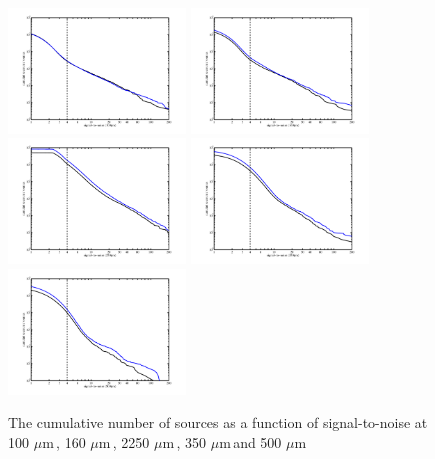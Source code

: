 \documentclass[useAMS,usenatbib]{mn2e}
\def\mic{ $\mu $m\,}
\begin{document}
\begin{figure}
\includegraphics[width=0.42\textwidth,clip,trim={0 9mm 0mm 16mm}]{cum_sn_100.pdf}
\includegraphics[width=0.42\textwidth,clip,trim={0 9mm 0mm 16mm}]{cum_sn_160.pdf}
\includegraphics[width=0.42\textwidth,clip,trim={0 9mm 0mm 16mm}]{cum_sn_250.pdf}
\includegraphics[width=0.42\textwidth,clip,trim={0 9mm 0mm 16mm}]{cum_sn_350.pdf}
\includegraphics[width=0.42\textwidth,clip,trim={0 9mm 0mm 16mm}]{cum_sn_500.pdf}
 \caption{\protect\label{fig_sn} The cumulative number of sources as a function
   of signal-to-noise at  100\mic, 160\mic, 2250\mic, 350\mic and 500\mic} 
\end{figure}
\end{document}
